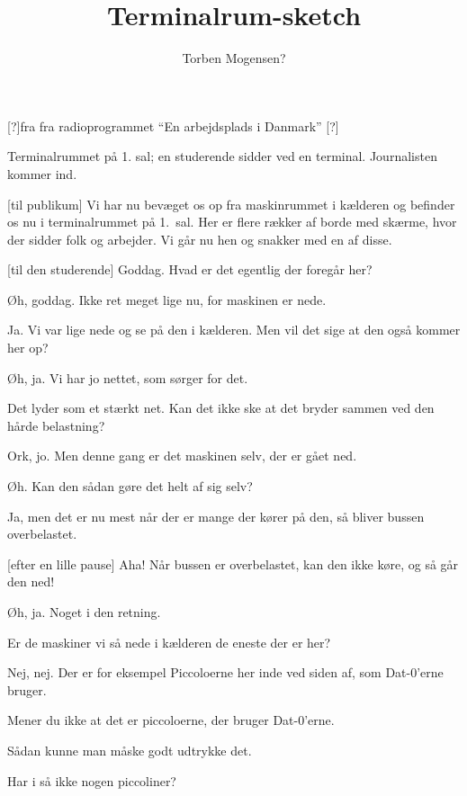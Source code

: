 \documentclass[a4paper,11pt]{article}
\title{Terminalrum-sketch}
\author{Torben Mogensen?}
\begin{document}
\begin{roles}
  [?]fra fra radioprogrammet ``En arbejdsplads i Danmark''
  [?]
\end{roles}

\begin{sketch}
  \scene Terminalrummet på 1. sal; en studerende sidder ved en
  terminal.  Journalisten kommer ind.
  
  [til publikum] Vi har nu bevæget os op fra
  maskinrummet i kælderen og befinder os nu i terminalrummet på
  1.\ sal.  Her er flere rækker af borde med skærme, hvor der sidder
  folk og arbejder.  Vi går nu hen og snakker med en af disse.

  [til den studerende] Goddag.  Hvad er det
  egentlig der foregår her?

   Øh, goddag.  Ikke ret meget lige nu, for maskinen er
  nede.

   Ja.  Vi var lige nede og se på den i kælderen.
  Men vil det sige at den også kommer her op?

   Øh, ja.  Vi har jo nettet, som sørger for det.

   Det lyder som et stærkt net.  Kan det ikke ske
  at det bryder sammen ved den hårde belastning?

   Ork, jo.  Men denne gang er det maskinen selv, der
  er gået ned.

   Øh.  Kan den sådan gøre det helt af sig selv?

   Ja, men det er nu mest når der er mange der kører
  på den, så bliver bussen overbelastet.

  [efter en lille pause] Aha!  Når bussen er
  overbelastet, kan den ikke køre, og så går den ned!

   Øh, ja.  Noget i den retning.

   Er de maskiner vi så nede i kælderen de eneste
  der er her?

   Nej, nej.  Der er for eksempel Piccoloerne her inde
  ved siden af, som Dat-0'erne bruger.

   Mener du ikke at det er piccoloerne, der bruger
  Dat-0'erne.  

   Sådan kunne man måske godt udtrykke det.

   Har i så ikke nogen piccoliner?


\end{sketch}
\end{document}
